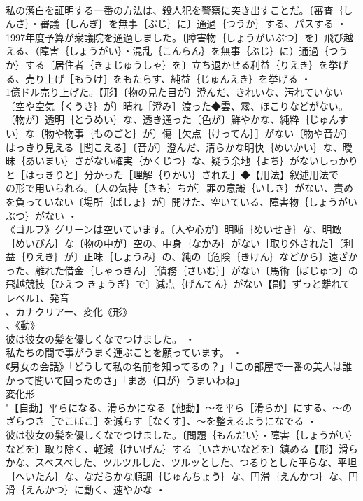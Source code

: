 \documentclass[8pt]{extreport}
\begin{document}
\begin{CJK}{UTF8}{min}
\\	私の潔白を証明する一番の方法は、殺人犯を警察に突き出すことだ。〔審査｛しんさ｝・審議｛しんぎ｝を無事｛ぶじ｝に〕通過｛つうか｝する、パスする ・
\\	1997年度予算が衆議院を通過しました。〔障害物｛しょうがいぶつ｝を〕飛び越える、（障害｛しょうがい｝・混乱｛こんらん｝を無事｛ぶじ｝に）通過｛つうか｝する〔居住者｛きょじゅうしゃ｝を〕立ち退かせる利益｛りえき｝を挙げる、売り上げ［もうけ］をもたらす、純益｛じゅんえき｝を挙げる ・
\\	1億ドル売り上げた。【形】〔物の見た目が〕澄んだ、きれいな、汚れていない〔空や空気｛くうき｝が〕晴れ［澄み］渡った◆雲、霧、ほこりなどがない。〔物が〕透明｛とうめい｝な、透き通った〔色が〕鮮やかな、純粋｛じゅんすい｝な〔物や物事｛ものごと｝が〕傷［欠点｛けってん｝］がない〔物や音が〕はっきり見える［聞こえる］〔音が〕澄んだ、清らかな明快｛めいかい｝な、曖昧｛あいまい｝さがない確実｛かくじつ｝な、疑う余地｛よち｝がないしっかりと［はっきりと］分かった［理解｛りかい｝された］◆【用法】叙述用法で
\\	の形で用いられる。〔人の気持｛きも｝ちが〕罪の意識｛いしき｝がない、責めを負っていない〔場所｛ばしょ｝が〕開けた、空いている、障害物｛しょうがいぶつ｝がない ・
\\	《ゴルフ》グリーンは空いています。〔人や心が〕明晰｛めいせき｝な、明敏｛めいびん｝な〔物の中が〕空の、中身｛なかみ｝がない［取り外された］〔利益｛りえき｝が〕正味｛しょうみ｝の、純の〔危険｛きけん｝などから〕遠ざかった、離れた借金｛しゃっきん｝［債務｛さいむ｝］がない〔馬術｛ばじゅつ｝の飛越競技｛ひえつ きょうぎ｝で〕減点｛げんてん｝がない【副】ずっと離れてレベル1、発音
\\	、カナクリアー、変化《形》
\\	、《動》
\\	彼は彼女の髪を優しくなでつけました。 ・
\\	私たちの間で事がうまく運ぶことを願っています。 ・
\\	《男女の会話》「どうして私の名前を知ってるの？」「この部屋で一番の美人は誰かって聞いて回ったのさ」「まあ（口が）うまいわね」
\\	変化形 
\\	"【自動】平らになる、滑らかになる【他動】～を平ら［滑らか］にする、～のざらつき［でこぼこ］を減らす［なくす］、～を整えるようになでる ・
\\	彼は彼女の髪を優しくなでつけました。〔問題｛もんだい｝・障害｛しょうがい｝などを〕取り除く、軽減｛けいげん｝する〔いさかいなどを〕鎮める【形】滑らかな、スベスベした、ツルツルした、ツルッとした、つるりとした平らな、平坦｛へいたん｝な、なだらかな順調｛じゅんちょう｝な、円滑｛えんかつ｝な、円滑｛えんかつ｝に動く、速やかな ・

\end{CJK}
\end{document}
